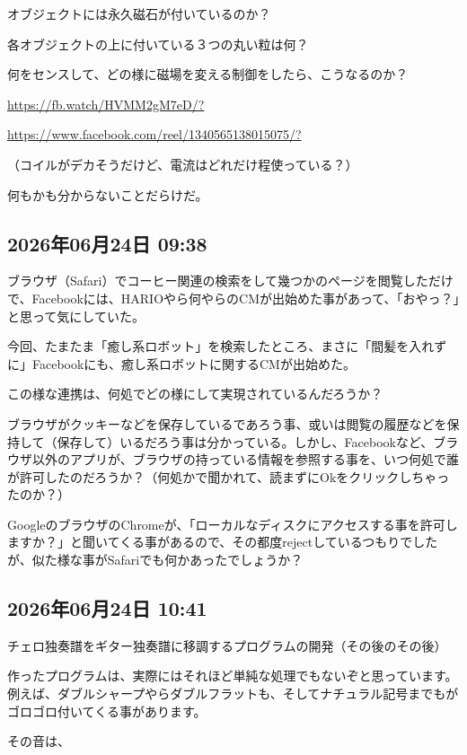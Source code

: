 オブジェクトには永久磁石が付いているのか？

各オブジェクトの上に付いている３つの丸い粒は何？

何をセンスして、どの様に磁場を変える制御をしたら、こうなるのか？

\url{https://fb.watch/HVMM2gM7eD/?}

\url{https://www.facebook.com/reel/1340565138015075/?}

（コイルがデカそうだけど、電流はどれだけ程使っている？）

何もかも分からないことだらけだ。

\subsection*{2026年06月24日 09:38}

ブラウザ（Safari）でコーヒー関連の検索をして幾つかのページを閲覧しただけで、Facebookには、HARIOやら何やらのCMが出始めた事があって、「おやっ？」と思って気にしていた。

今回、たまたま「癒し系ロボット」を検索したところ、まさに「間髪を入れずに」Facebookにも、癒し系ロボットに関するCMが出始めた。

この様な連携は、何処でどの様にして実現されているんだろうか？

ブラウザがクッキーなどを保存しているであろう事、或いは閲覧の履歴などを保持して（保存して）いるだろう事は分かっている。しかし、Facebookなど、ブラウザ以外のアプリが、ブラウザの持っている情報を参照する事を、いつ何処で誰が許可したのだろうか？（何処かで聞かれて、読まずにOkをクリックしちゃったのか？）

GoogleのブラウザのChromeが、「ローカルなディスクにアクセスする事を許可しますか？」と聞いてくる事があるので、その都度rejectしているつもりでしたが、似た様な事がSafariでも何かあったでしょうか？

\subsection*{2026年06月24日 10:41}

チェロ独奏譜をギター独奏譜に移調するプログラムの開発（その後のその後）

作ったプログラムは、実際にはそれほど単純な処理でもないぞと思っています。例えば、ダブルシャープやらダブルフラットも、そしてナチュラル記号までもがゴロゴロ付いてくる事があります。

その音は、

